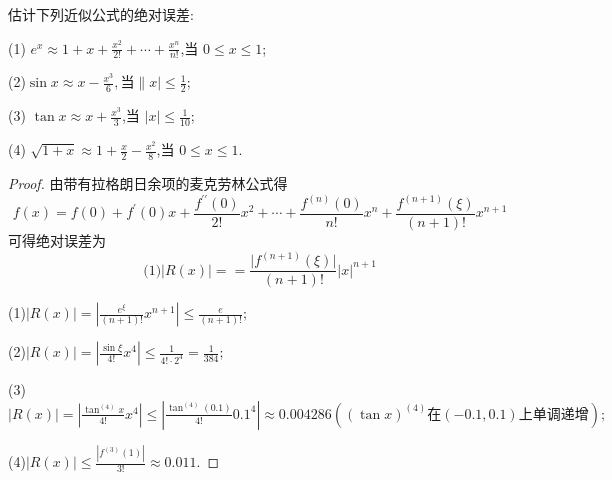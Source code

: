 \documentclass[lang=cn,newtx,10pt,scheme=chinese]{../Template/elegantbook}
\begin{document}
\begin{exercise}
估计下列近似公式的绝对误差:

(1) \(e^{x}\approx1 + x+\frac{x^{2}}{2!}+\cdots+\frac{x^{n}}{n!}\),当 \(0\leqslant  x\leqslant 1\);

(2)$\sin x\approx x-\frac{x^3}{6},当\|x|\le\frac{1}{2}$;

(3) \(\tan x\approx x+\frac{x^{3}}{3}\),当 \(\vert x\vert\leqslant \frac{1}{10}\);

(4) \(\sqrt{1 + x}\approx1+\frac{x}{2}-\frac{x^{2}}{8}\),当 \(0\leqslant  x\leqslant 1\).
\begin{proof}
    由带有拉格朗日余项的麦克劳林公式得
    \begin{equation}
    f(x)=f(0)+f^{\prime}(0)x+\frac{f^{\prime\prime}(0)}{2!}x^{2}+\cdots+\frac{f^{(n)}(0)}{n!}x^{n}+\frac{f^{(n + 1)}(\xi)}{(n + 1)!}x^{n + 1}
    \nonumber
    \end{equation}
    可得绝对误差为
    \begin{equation}
        \mathbb{(}1)|R\left( x \right) |==\frac{\vert f^{(n + 1)}(\xi)\vert}{(n + 1)!}\vert x\vert^{n + 1}
        \nonumber
    \end{equation}

        (1)$|R\left( x \right) |=\left| \frac{e^{\xi}}{\left( n+1 \right) !}x^{n+1} \right|\leqslant \frac{e}{\left( n+1 \right) !};$
        
        (2)$|R\left( x \right) |=\left| \frac{\sin \xi}{4!}x^4 \right|\leqslant \frac{1}{4!\cdot 2^4}=\frac{1}{384};$

        (3)$|R\left( x \right) |=\left| \frac{\tan ^{\left( 4 \right)}x}{4!}x^4 \right|\leqslant \left| \frac{\tan ^{\left( 4 \right)}\left( 0.1 \right)}{4!}0.1^4 \right|\approx 0.004286 \left( \left( \tan x \right) ^{\left( 4 \right)}\text{在}\left( -0.1,0.1 \right) \text{上单调递增} \right) ;$
        
        (4)$|R\left( x \right) |\leqslant \frac{\left| f^{\left( 3 \right)}\left( 1 \right) \right|}{3!}\approx 0.011.$

\end{proof}
\end{exercise}
\end{document}
